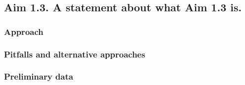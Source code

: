 
\subsection*{Aim 1.3. A statement about what Aim 1.3 is.}

\subsubsection*{Approach}

\subsubsection*{Pitfalls and alternative approaches}

\subsubsection*{Preliminary data}

